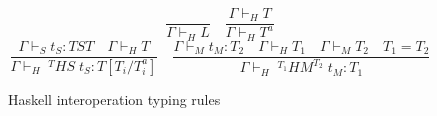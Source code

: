 \begin{figure}
\[
\frac{}{\Gamma\vdash_{H}L}
\quad
\frac{\Gamma\vdash_{H}T}{\Gamma\vdash_{H}T^{a}}
\]
\bigskip
\[
\frac{\Gamma\vdash_{S}t_{S}:TST\quad\Gamma\vdash_{H}T}{\Gamma\vdash_{H}\;^{T}HS\;t_{S}:T[T_{i}/T^{a}_{i}]}
\quad
\frac{\Gamma\vdash_{M}t_{M}:T_{2}\quad\Gamma\vdash_{H}T_{1}\quad\Gamma\vdash_{M}T_{2}\quad T_{1}=T_{2}}{\Gamma\vdash_{H}\;^{T_{1}}HM^{T_{2}}\;t_{M}:T_{1}}
\]
\caption{Haskell interoperation typing rules}
\label{hitr}
\end{figure}